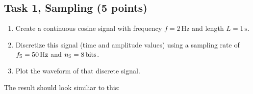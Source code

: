 \subsection*{Task 1, Sampling \textnormal{(5 points)}}
\begin{enumerate}
	\item Create a continuous cosine signal with frequency ${f=2\,\textrm{Hz}}$ and length ${L=1\,\textrm{s}}$.
	\item Discretize this signal (time and amplitude values) using a sampling rate of ${f_{\textrm S}=50\,\textrm{Hz}}$ and ${n_{\textrm S}=8\,\textrm{bits}}$.
	\item Plot the waveform of that discrete signal.
\end{enumerate}

The result should look similiar to this:
\begin{figure}[!h]
	\centering
	\begin{subfigure}[c]{0.48\linewidth}
	\end{subfigure}
\end{figure}

